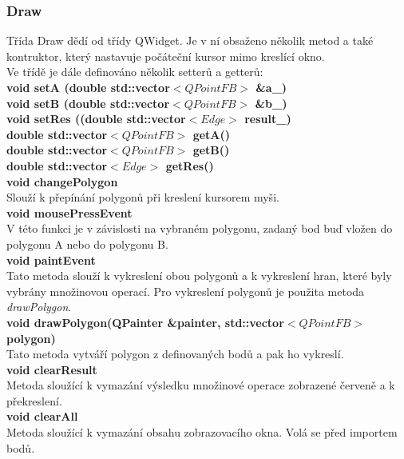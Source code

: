 \documentclass[a4paper,11pt,twoside]{article}
\begin{document}
\newpage
\vspace*{-1cm}
\subsubsection{Draw}
Třída Draw dědí od třídy QWidget. Je v ní obsaženo několik metod a také kontruktor, který nastavuje počáteční kursor mimo kreslící okno.\\

\noindent Ve třídě je dále definováno několik setterů a getterů:\\
\noindent\textbf{void setA (double std::vector$<QPointFB>$ \&a\_)}\\
\noindent\textbf{void setB (double std::vector$<QPointFB>$ \&b\_)}\\
\noindent\textbf{void setRes ((double std::vector$<Edge>$ result\_)}\\
\noindent\textbf{double std::vector$<QPointFB>$ getA()}\\
\noindent\textbf{double std::vector$<QPointFB>$ getB()}\\
\noindent\textbf{double std::vector$<Edge>$ getRes()}\\

\noindent\textbf{void changePolygon}\\
Slouží k přepínání polygonů při kreslení kursorem myši.\\

\noindent\textbf{void mousePressEvent}\\
V této funkci je v závislosti na vybraném polygonu, zadaný bod buď vložen do polygonu A nebo do polygonu B.\\

\noindent\textbf{void paintEvent}\\
Tato metoda slouží k vykreslení obou polygonů a k vykreslení hran, které byly vybrány množinovou operací. Pro vykreslení polygonů je použita metoda \textit{drawPolygon}.\\

\noindent\textbf{void drawPolygon(QPainter \&painter, std::vector$<QPointFB>$ polygon)}\\
Tato metoda vytváří polygon z definovaných bodů a pak ho vykreslí.\\

\noindent\textbf{void clearResult}\\
Metoda sloužící k vymazání výsledku množinové operace zobrazené červeně a k překreslení.  \\

\newpage
\vspace*{-1cm}
\noindent\textbf{void clearAll}\\
Metoda sloužící k vymazání obsahu zobrazovacího okna. Volá se před importem bodů.\\
\end{document}
